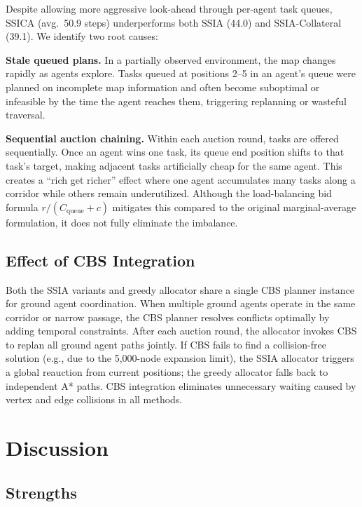 \documentclass[conference]{IEEEtran}
\begin{document}
Despite allowing more aggressive look-ahead through per-agent task queues, SSICA (avg.\ 50.9 steps) underperforms both SSIA (44.0) and SSIA-Collateral (39.1). We identify two root causes:

\textbf{Stale queued plans.} In a partially observed environment, the map changes rapidly as agents explore. Tasks queued at positions 2--5 in an agent's queue were planned on incomplete map information and often become suboptimal or infeasible by the time the agent reaches them, triggering replanning or wasteful traversal.

\textbf{Sequential auction chaining.} Within each auction round, tasks are offered sequentially. Once an agent wins one task, its queue end position shifts to that task's target, making adjacent tasks artificially cheap for the same agent. This creates a ``rich get richer'' effect where one agent accumulates many tasks along a corridor while others remain underutilized. Although the load-balancing bid formula $r / (C_{\text{queue}} + c)$ mitigates this compared to the original marginal-average formulation, it does not fully eliminate the imbalance.

\subsection{Effect of CBS Integration}

Both the SSIA variants and greedy allocator share a single CBS planner instance for ground agent coordination. When multiple ground agents operate in the same corridor or narrow passage, the CBS planner resolves conflicts optimally by adding temporal constraints. After each auction round, the allocator invokes CBS to replan all ground agent paths jointly. If CBS fails to find a collision-free solution (e.g., due to the 5{,}000-node expansion limit), the SSIA allocator triggers a global reauction from current positions; the greedy allocator falls back to independent A* paths. CBS integration eliminates unnecessary waiting caused by vertex and edge collisions in all methods.

\section{Discussion}

\subsection{Strengths}
\end{document}

